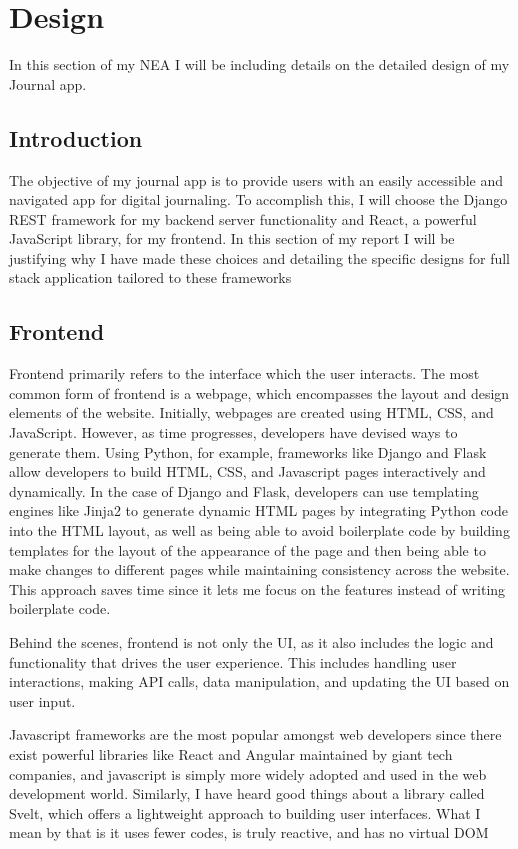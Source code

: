 \chapter{Design}
In this section of my NEA I will be including details on the detailed design of my Journal app. 


\section{Introduction}
The objective of my journal app is to provide users with an easily accessible and navigated app for digital journaling. To accomplish this, I will choose the Django REST framework for my backend server functionality and React, a powerful JavaScript library, for my frontend. In this section of my report I will be justifying why I have made these choices and detailing the specific designs for full stack application tailored to these frameworks

\section{Frontend}
Frontend primarily refers to the interface which the user interacts. The most common form of frontend is a webpage, which encompasses the layout and design elements of the website. Initially, webpages are created using HTML, CSS, and JavaScript. However, as time progresses, developers have devised ways to generate them. Using Python, for example, frameworks like Django and Flask allow developers to build HTML, CSS, and Javascript pages interactively and dynamically. In the case of Django and Flask, developers can use templating engines like Jinja2 to generate dynamic HTML pages by integrating Python code into the HTML layout, as well as being able to avoid boilerplate code by building templates for the layout of the appearance of the page and then being able to make changes to different pages while maintaining consistency across the website. This approach saves time since it lets me focus on the features instead of writing boilerplate code.

Behind the scenes, frontend is not only the UI, as it also includes the logic and functionality that drives the user experience. This includes handling user interactions, making API calls, data manipulation, and updating the UI based on user input.

Javascript frameworks are the most popular amongst web developers since there exist powerful libraries like React and Angular maintained by giant tech companies, and javascript is simply more widely adopted and used in the web development world. Similarly, I have heard good things about a library called Svelt, which offers a lightweight approach to building user interfaces. What I mean by that is it uses fewer codes, is truly reactive, and has no virtual DOM

